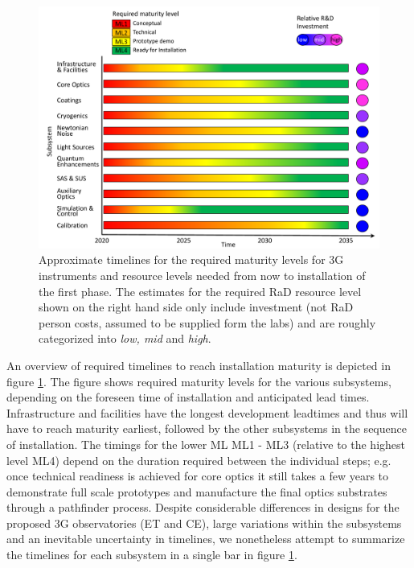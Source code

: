 \section{}
\begin{figure}[ht]
\centering
\includegraphics*[width= \textwidth]{Figures/3G_Readiness_Levelsblue.pdf}
\caption{Approximate timelines for the required maturity levels for \ac{3G} instruments and resource levels needed from now to installation of the first phase. The estimates for the required \ac{RaD} resource level shown on the right hand side only include investment (not \ac{RaD} person costs, assumed to be supplied form the labs) and are roughly categorized into \textit{low, mid} and \textit{high}.\\
}
\label{fig:maturity}
\end{figure}

An overview of required timelines to reach installation maturity is depicted in figure \ref{fig:maturity}. The figure shows required maturity levels for the various subsystems, depending on the foreseen time of installation and anticipated lead times. Infrastructure and facilities have the longest development leadtimes and thus will have to reach maturity earliest, followed by the other subsystems in the sequence of installation. The timings for the lower \ac{ML} ML1 - ML3 (relative to the highest level ML4) depend on the duration required between the individual steps; e.g. once technical readiness is achieved for core optics it still takes a few years to demonstrate full scale prototypes and manufacture the final optics substrates through a pathfinder process. Despite considerable differences in designs for the proposed \ac{3G} observatories (\ac{ET} and \ac{CE}), large variations within the subsystems and an inevitable uncertainty in timelines, we nonetheless attempt to summarize the timelines  for each subsystem in a single bar in figure \ref{fig:maturity}.  

